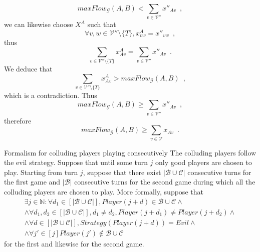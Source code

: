 \begin{itemize}
\begin{equation}
             maxFlow_{\mathcal{G}}\left(A, B\right) < \sum\limits_{v \in \mathcal{V}''}x''_{Av} \enspace,
          \end{equation}
          we can likewise choose $X^A$ such that
          \begin{equation}
             \forall v, w \in \mathcal{V}'' \setminus \{T\}, x^A_{vw} = x''_{vw} \enspace,
          \end{equation}
          thus
          \begin{equation}
             \sum\limits_{v \in \mathcal{V}'' \setminus \{T\}}x^A_{Av} = \sum\limits_{v \in \mathcal{V}''}x''_{Av} \enspace.
          \end{equation}
          We deduce that
          \begin{equation}
             \sum\limits_{v \in \mathcal{V}'' \setminus \{T\}}x^A_{Av} > maxFlow_{\mathcal{G}}\left(A, B\right) \enspace,
          \end{equation}
          which is a contradiction. Thus
          \begin{equation}
             maxFlow_{\mathcal{G}}\left(A, B\right) \geq \sum\limits_{v \in \mathcal{V}''}x''_{Av} \enspace,
          \end{equation}
          therefore
          \begin{equation}
             maxFlow_{\mathcal{G}}\left(A, B\right) \geq \sum\limits_{v \in \mathcal{V}}x_{Av} \enspace.
          \end{equation}
       \end{itemize}

Formalism for colluding players playing consecutively
       The colluding players follow the evil strategy. Suppose that until some turn $j$ only good players are chosen to play.
       Starting from turn $j$, suppose that there exist $|\mathcal{B} \cup \mathcal{C}|$ consecutive turns for the first game
       and $|\mathcal{B}|$ consecutive turns for the second game during which all the colluding players are chosen to play.
       More formally, suppose that
       \begin{equation}
       \begin{gathered}
          \exists j \in \mathbb{N} : \forall d_1 \in [|\mathcal{B} \cup \mathcal{C}|], Player(j+d) \in \mathcal{B} \cup
          \mathcal{C} \wedge \\
          \wedge \forall d_1, d_2 \in [|\mathcal{B} \cup \mathcal{C}|], d_1 \neq d_2, Player(j + d_1) \neq Player(j + d_2)
          \wedge \\
          \wedge \forall d \in [|\mathcal{B} \cup \mathcal{C}|], Strategy(Player(j+d)) = Evil \wedge \\
          \wedge \forall j' \in [j] Player(j') \notin \mathcal{B} \cup \mathcal{C}
       \end{gathered}
       \end{equation}
       for the first and likewise for the second game. \\

